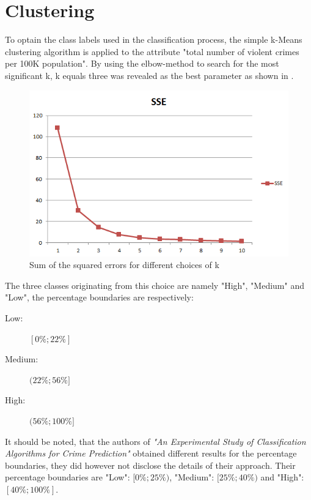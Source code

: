 \section{Clustering}
To optain the class labels used in the classification process, the simple k-Means clustering algorithm is applied to the attribute "total number of violent crimes per
100K population". By using the elbow-method to search for the most significant k, k equals three was revealed as the best parameter as shown in .
\begin{figure}[H]
	\centering
	\includegraphics[width=\columnwidth]{../../charts/SSE.png}
	\caption{Sum of the squared errors for different choices of k}
	\label{fig:sse}
\end{figure}
The three classes originating from this choice are namely "High", "Medium" and "Low", the percentage boundaries are respectively:
\begin{description}
	\item[Low:] \([0\%; 22\%]\) 
	\item[Medium:] \((22\%; 56\%]\)
	\item[High:] \((56\%; 100\%]\)
\end{description}

It should be noted, that the authors of \textit{"An Experimental Study of Classification Algorithms for Crime Prediction"} \cite{indian} obtained different results for the percentage boundaries, they did however not disclose the details of their approach. Their percentage boundaries are "Low": \([0\%;25\%)\), "Medium": \([25\%; 40\%)\) and "High": \([40\%; 100\%]\).



